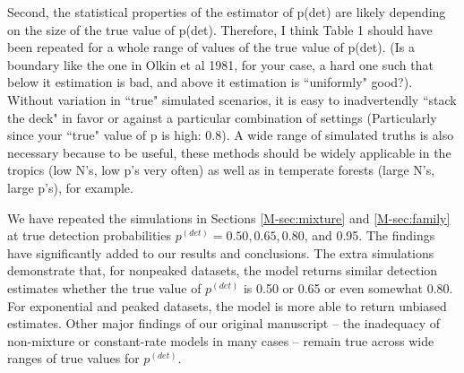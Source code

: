 \documentclass[12pt]{article}
\renewenvironment{quote}  %
              {\list{}{\rightmargin\leftmargin}\normalfont%
               \item\relax}
              {\endlist}
\newcommand{\pdet}{p^{(det)}}
\begin{document}
Second, the statistical properties of the estimator of p(det) are likely depending on the size of the true value of p(det). Therefore, I think Table 1 should have been repeated for a whole range of values of the true value of p(det).
(Is a boundary like the one in Olkin et al 1981, for your case, a hard one such that below it estimation is bad, and above it estimation is ``uniformly" good?).
Without variation in ``true" simulated scenarios, it is easy to inadvertendly ``stack the deck" in favor or against a particular combination of settings (Particularly since your ``true" value of p is high: 0.8). A wide range of simulated truths is also necessary because to be useful, these methods should be widely applicable in the
tropics (low N's, low p's very often) as well as in temperate forests (large N's, large p's), for example.
\begin{quote}
We have repeated the simulations in Sections \ref{M-sec:mixture} and \ref{M-sec:family} at true detection probabilities $\pdet = 0.50, 0.65, 0.80$, and 0.95.
The findings have significantly added to our results and conclusions.
The extra simulations demonstrate that, for nonpeaked datasets, the model returns similar detection estimates whether the true value of $\pdet$ is 0.50 or 0.65 or even somewhat 0.80.
For exponential and peaked datasets, the model is more able to return unbiased estimates.
Other major findings of our original manuscript -- the inadequacy of non-mixture or constant-rate models in many cases -- remain true across wide ranges of true values for $\pdet$.

\end{quote}
\end{document}
